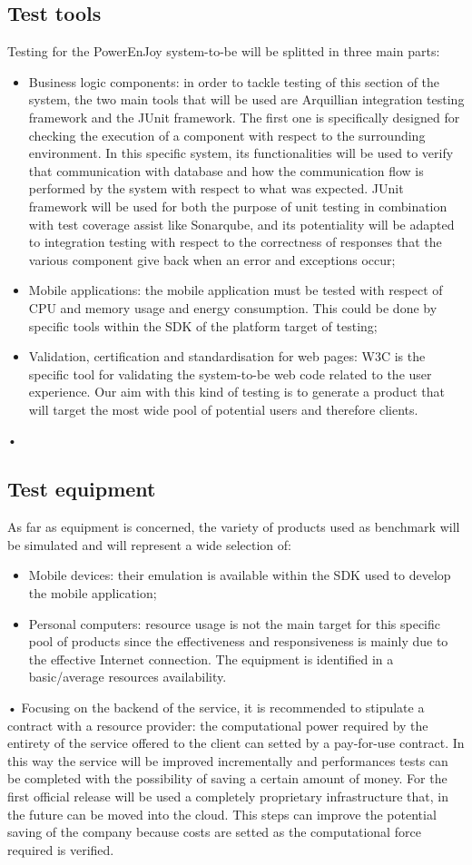 \documentclass[10pt, a4paper,titlepage]{article}
\begin{document}
\subsection{Test tools}
Testing for the PowerEnJoy system-to-be will be splitted in three main parts:
\begin{itemize}
\item Business logic components: in order to tackle testing of this section of the system, the two main tools that will be used are Arquillian integration testing framework and the JUnit framework. The first one is specifically designed for checking the execution of a component with respect to the surrounding environment. In this specific system, its functionalities will be used to verify that communication with database and how the communication flow is performed by the system with respect to what was expected. JUnit framework will be used for both the purpose of unit testing in combination with test coverage assist like Sonarqube, and its potentiality will be adapted to integration testing with respect to the correctness of responses that the various component give back when an error and exceptions occur;
\item Mobile applications: the mobile application must be tested with respect of CPU and memory usage and energy consumption. This could be done by specific tools within the SDK of the platform target of testing;
\item Validation, certification and standardisation for web pages: W3C is the specific tool for validating the system-to-be web code related to the user experience. Our aim with this kind of testing is to generate a product that will target the most wide pool of potential users and therefore clients.
\end{itemize}•
\subsection{Test equipment}
As far as equipment is concerned, the variety of products used as benchmark will be simulated and will represent a wide selection of:
\begin{itemize}
\item Mobile devices: their emulation is available within the SDK used to develop the mobile application;
\item Personal computers: resource usage is not the main target for this specific pool of products since the effectiveness and responsiveness is mainly due to the effective Internet connection. The equipment is identified in a basic/average resources availability.
\end{itemize}•
Focusing on the backend of the service, it is recommended to stipulate a contract with a resource provider: the computational power required by the entirety of the service offered to the client can setted by a pay-for-use contract. In this way the service will be improved incrementally and performances tests can be completed with the possibility of saving a certain amount of money. For the first official release will be used a completely proprietary infrastructure that, in the future can be moved into the cloud. This steps can improve the potential saving of the company because costs are setted as the computational force required is verified.
\end{document}
